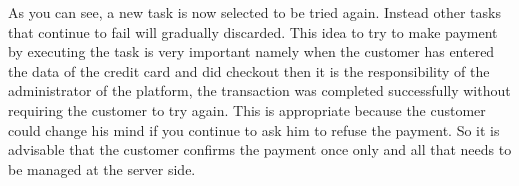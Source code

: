 \begin{itemize}
As you can see, a new task is now selected to be tried again. Instead other tasks that continue to fail will gradually discarded.
\newline
This idea to try to make payment by executing the task is very important namely when the customer has entered the data of the credit card and did checkout then it is the responsibility of the administrator of the platform, the transaction was completed successfully without requiring the customer to try again.
\newline
This is appropriate because the customer could change his mind if you continue to ask him to refuse the payment. So it is advisable that the customer confirms the payment once only and all that needs to be managed at the server side.
\end{itemize}